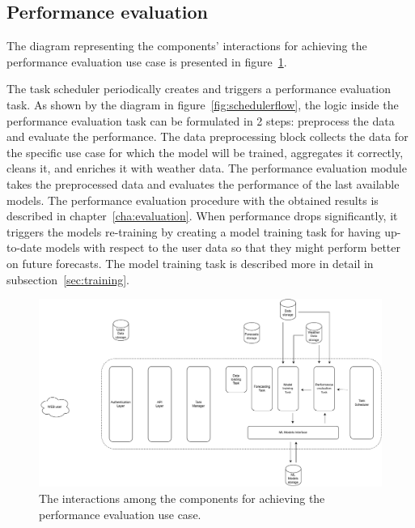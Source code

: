 \vspace{0.1 cm}
\subsection{Performance evaluation}
\label{sec:scheduler}
\vspace{0.1 cm}

The diagram representing the components' interactions for achieving the performance evaluation use case is presented in figure~\ref{fig:schedulerinteractions}.

The task scheduler periodically creates and triggers a performance evaluation task.
As shown by the diagram in figure~\ref{fig:schedulerflow}, the logic inside the performance evaluation task can be formulated in 2 steps: preprocess the data and evaluate the performance.
The data preprocessing block collects the data for the specific use case for which the model will be trained, aggregates it correctly, cleans it, and enriches it with weather data.
The performance evaluation module takes the preprocessed data and evaluates the performance of the last available models.
The performance evaluation procedure with the obtained results is described in chapter~\ref{cha:evaluation}.
When performance drops significantly, it triggers the models re-training by creating a model training task for having up-to-date models with respect to the user data so that they might perform better on future forecasts.
The model training task is described more in detail in subsection~\ref{sec:training}.

\begin{figure}[H]
\centering
\includegraphics[width=1\textwidth]{images/architecture_scheduler_interactions}
\caption{The interactions among the components for achieving the performance evaluation use case.}
\label{fig:schedulerinteractions}
\end{figure}

